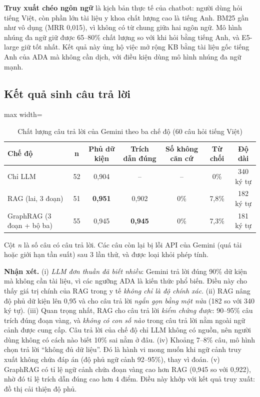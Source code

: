 \textbf{Truy xuất chéo ngôn ngữ} là kịch bản thực tế của chatbot: người dùng hỏi tiếng Việt, còn phần lớn tài liệu y khoa chất lượng cao là tiếng Anh. BM25 gần như vô dụng (MRR 0,015), vì không có từ chung giữa hai ngôn ngữ. Mô hình nhúng đa ngữ giữ được 65–80\% chất lượng so với khi hỏi bằng tiếng Anh, và E5-large giữ tốt nhất. Kết quả này ủng hộ việc mở rộng KB bằng tài liệu gốc tiếng Anh của ADA mà không cần dịch, với điều kiện dùng mô hình nhúng đa ngữ mạnh.

\subsection{Kết quả sinh câu trả lời}

\begin{table}[H]
\centering
\caption{Chất lượng câu trả lời của Gemini theo ba chế độ (60 câu hỏi tiếng Việt)}
\label{tab:ch5-gen}
\small
\begin{adjustbox}{max width=\linewidth}
\begin{tabular}{@{}lcccccc@{}}
\toprule
\textbf{Chế độ} & \textbf{n} & \textbf{Phủ dữ kiện} & \textbf{Trích dẫn đúng} & \textbf{Số không căn cứ} & \textbf{Từ chối} & \textbf{Độ dài} \\
\midrule
Chỉ LLM & 52 & 0,904 & -- & -- & 0\% & 340 ký tự \\
RAG (lai, 3 đoạn) & 51 & \textbf{0,951} & 0,902 & 0\% & 7,8\% & 182 ký tự \\
GraphRAG (3 đoạn + bộ ba) & 55 & 0,945 & \textbf{0,945} & 0\% & 7,3\% & 181 ký tự \\
\bottomrule
\end{tabular}
\end{adjustbox}
\end{table}

Cột \emph{n} là số câu có câu trả lời. Các câu còn lại bị lỗi API của Gemini (quá tải hoặc giới hạn tần suất) sau 3 lần thử, và được loại khỏi phép tính.

\textbf{Nhận xét.} (i) \emph{LLM đơn thuần đã biết nhiều}: Gemini trả lời đúng 90\% dữ kiện mà không cần tài liệu, vì các ngưỡng ADA là kiến thức phổ biến. Điều này cho thấy giá trị chính của RAG trong y tế \emph{không chỉ là độ chính xác}. (ii) RAG nâng độ phủ dữ kiện lên 0,95 và cho câu trả lời \emph{ngắn gọn bằng một nửa} (182 so với 340 ký tự). (iii) Quan trọng nhất, RAG cho câu trả lời \emph{kiểm chứng được}: 90–95\% câu trích đúng đoạn vàng, và \emph{không có con số nào} trong câu trả lời nằm ngoài ngữ cảnh được cung cấp. Câu trả lời của chế độ chỉ LLM không có nguồn, nên người dùng không có cách nào biết 10\% sai nằm ở đâu. (iv) Khoảng 7–8\% câu, mô hình chọn trả lời ``không đủ dữ liệu''. Đó là hành vi mong muốn khi ngữ cảnh truy xuất không chứa đáp án (độ phủ ngữ cảnh 92–95\%), thay vì đoán. (v) GraphRAG có tỉ lệ ngữ cảnh chứa đoạn vàng cao hơn RAG (0,945 so với 0,922), nhờ đó tỉ lệ trích dẫn đúng cao hơn 4 điểm. Điều này khớp với kết quả truy xuất: đồ thị cải thiện độ phủ.

